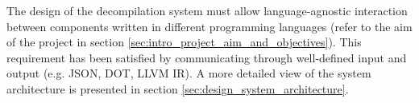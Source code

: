 The design of the decompilation system must allow language-agnostic interaction between components written in different programming languages (refer to the aim of the project in section \ref{sec:intro_project_aim_and_objectives}). This requirement has been satisfied by communicating through well-defined input and output (e.g. JSON, DOT, LLVM IR). A more detailed view of the system architecture is presented in section \ref{sec:design_system_architecture}.






